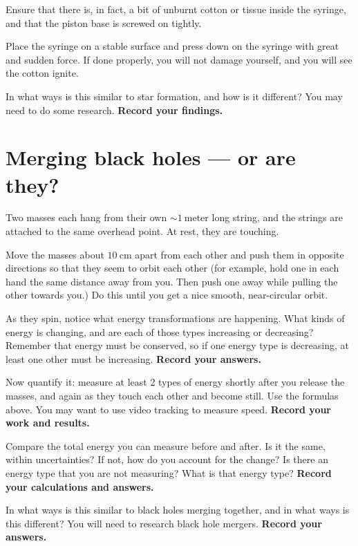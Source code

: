 \begin{steps}
	\item Ensure that there is, in fact, a bit of unburnt cotton or tissue inside the syringe, and that the piston base is screwed on tightly.
	
	\item Place the syringe on a stable surface and press down on the syringe with great and sudden force. If done properly, you will not damage yourself, and you will see the cotton ignite.

	\item In what ways is this similar to star formation, and how is it different? You may need to do some research. \textbf{Record your findings.}
\end{steps}

\section{Merging black holes --- or are they?}

Two masses each hang from their own $\sim 1\:$meter long string, and the strings are attached to the same overhead point. At rest, they are touching.

\begin{steps}
	\item Move the masses about $10\:$cm apart from each other and push them in opposite directions so that they seem to orbit each other (for example, hold one in each hand the same distance away from you. Then push one away while pulling the other towards you.) Do this until you get a nice smooth, near-circular orbit.
	
	\item As they spin, notice what energy transformations are happening. What kinds of energy is changing, and are each of those types increasing or decreasing? Remember that energy must be conserved, so if one energy type is decreasing, at least one other must be increasing. \textbf{Record your answers.}
	
	\item Now quantify it: measure at least 2 types of energy shortly after you release the masses, and again as they touch each other and become still. Use the formulas above. You may want to use video tracking to measure speed. \textbf{Record your work and results.}
	
	\item Compare the total energy you can measure before and after. Is it the same, within uncertainties? If not, how do you account for the change? Is there an energy type that you are not measuring? What is that energy type? \textbf{Record your calculations and answers.}
	
	\item In what ways is this similar to black holes merging together, and in what ways is this different? You will need to research black hole mergers. \textbf{Record your answers.}
\end{steps}

